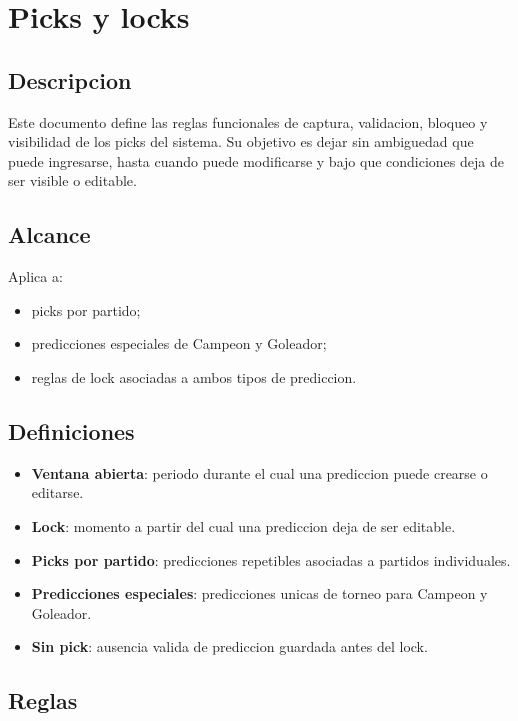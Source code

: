 \section{Picks y locks}

\subsection{Descripcion}

Este documento define las reglas funcionales de captura, validacion, bloqueo y visibilidad de los picks del sistema. Su objetivo es dejar sin ambiguedad que puede ingresarse, hasta cuando puede modificarse y bajo que condiciones deja de ser visible o editable.

\subsection{Alcance}

Aplica a:

\begin{itemize}
  \item picks por partido;
  \item predicciones especiales de Campeon y Goleador;
  \item reglas de lock asociadas a ambos tipos de prediccion.
\end{itemize}

\subsection{Definiciones}

\begin{itemize}
  \item \textbf{Ventana abierta}: periodo durante el cual una prediccion puede crearse o editarse.
  \item \textbf{Lock}: momento a partir del cual una prediccion deja de ser editable.
  \item \textbf{Picks por partido}: predicciones repetibles asociadas a partidos individuales.
  \item \textbf{Predicciones especiales}: predicciones unicas de torneo para Campeon y Goleador.
  \item \textbf{Sin pick}: ausencia valida de prediccion guardada antes del lock.
\end{itemize}

\subsection{Reglas}

